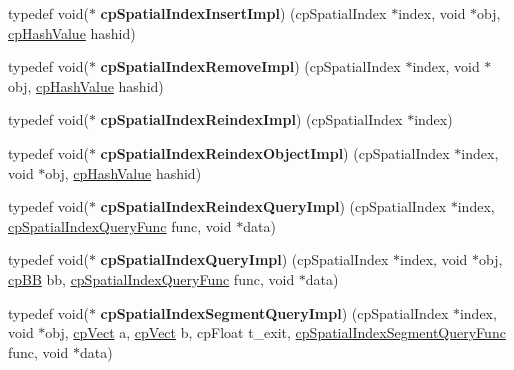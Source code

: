 \begin{DoxyCompactItemize}
typedef void($\ast$ {\bfseries cp\+Spatial\+Index\+Insert\+Impl}) (cp\+Spatial\+Index $\ast$index, void $\ast$obj, \hyperlink{group__basicTypes_gae7eb4775a9f43914a15553ca65a048f4}{cp\+Hash\+Value} hashid)
\item 
\mbox{\label{group__cpSpatialIndex_gaf943dffbd088c1f4809a254b0eb96860}} 
typedef void($\ast$ {\bfseries cp\+Spatial\+Index\+Remove\+Impl}) (cp\+Spatial\+Index $\ast$index, void $\ast$obj, \hyperlink{group__basicTypes_gae7eb4775a9f43914a15553ca65a048f4}{cp\+Hash\+Value} hashid)
\item 
\mbox{\label{group__cpSpatialIndex_gae8c6986404106d1b4717ef0a24463fe2}} 
typedef void($\ast$ {\bfseries cp\+Spatial\+Index\+Reindex\+Impl}) (cp\+Spatial\+Index $\ast$index)
\item 
\mbox{\label{group__cpSpatialIndex_ga5109ec90ae7c99cf421d1b233db63900}} 
typedef void($\ast$ {\bfseries cp\+Spatial\+Index\+Reindex\+Object\+Impl}) (cp\+Spatial\+Index $\ast$index, void $\ast$obj, \hyperlink{group__basicTypes_gae7eb4775a9f43914a15553ca65a048f4}{cp\+Hash\+Value} hashid)
\item 
\mbox{\label{group__cpSpatialIndex_gad1b5f2682c09f5f4e5e48f751e8e25b6}} 
typedef void($\ast$ {\bfseries cp\+Spatial\+Index\+Reindex\+Query\+Impl}) (cp\+Spatial\+Index $\ast$index, \hyperlink{group__cpSpatialIndex_ga7bcf80d017b29d32d9f8011405b241f9}{cp\+Spatial\+Index\+Query\+Func} func, void $\ast$data)
\item 
\mbox{\label{group__cpSpatialIndex_ga15683b78b71535766a2e69d203196549}} 
typedef void($\ast$ {\bfseries cp\+Spatial\+Index\+Query\+Impl}) (cp\+Spatial\+Index $\ast$index, void $\ast$obj, \hyperlink{structcpBB}{cp\+BB} bb, \hyperlink{group__cpSpatialIndex_ga7bcf80d017b29d32d9f8011405b241f9}{cp\+Spatial\+Index\+Query\+Func} func, void $\ast$data)
\item 
\mbox{\label{group__cpSpatialIndex_gab91c6534f37f1a493c58934417b16f09}} 
typedef void($\ast$ {\bfseries cp\+Spatial\+Index\+Segment\+Query\+Impl}) (cp\+Spatial\+Index $\ast$index, void $\ast$obj, \hyperlink{structcpVect}{cp\+Vect} a, \hyperlink{structcpVect}{cp\+Vect} b, cp\+Float t\+\_\+exit, \hyperlink{group__cpSpatialIndex_ga829ef5f6fd840ea31370d53db9045373}{cp\+Spatial\+Index\+Segment\+Query\+Func} func, void $\ast$data)

\end{DoxyCompactItemize}
